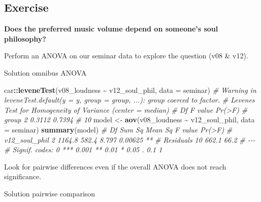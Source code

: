 \documentclass[
]{book}
\newenvironment{Shaded}{\begin{snugshade}}{\end{snugshade}}
\newcommand{\AttributeTok}[1]{\textcolor[rgb]{0.13,0.29,0.53}{#1}}
\newcommand{\CommentTok}[1]{\textcolor[rgb]{0.56,0.35,0.01}{\textit{#1}}}
\newcommand{\FunctionTok}[1]{\textcolor[rgb]{0.13,0.29,0.53}{\textbf{#1}}}
\newcommand{\NormalTok}[1]{#1}
\newcommand{\OtherTok}[1]{\textcolor[rgb]{0.56,0.35,0.01}{#1}}
\newcommand{\SpecialCharTok}[1]{\textcolor[rgb]{0.81,0.36,0.00}{\textbf{#1}}}
\begin{document}
\subsection{Exercise}\label{exercise-7}

\textbf{Does the preferred music volume depend on someone's soul philosophy?}

Perform an ANOVA on our seminar data to explore the question (v08 \& v12).

Solution omnibus ANOVA

\begin{Shaded}
\begin{Highlighting}[]
\NormalTok{car}\SpecialCharTok{::}\FunctionTok{leveneTest}\NormalTok{(v08\_loudness }\SpecialCharTok{\textasciitilde{}}\NormalTok{ v12\_soul\_phil, }\AttributeTok{data =}\NormalTok{ seminar)}
\CommentTok{\# Warning in leveneTest.default(y = y, group = group, ...): group coerced to factor.}
\CommentTok{\# Levene\textquotesingle{}s Test for Homogeneity of Variance (center = median)}
\CommentTok{\#       Df F value Pr(\textgreater{}F)}
\CommentTok{\# group  2  0.3112 0.7394}
\CommentTok{\#       10}
\NormalTok{model }\OtherTok{\textless{}{-}} \FunctionTok{aov}\NormalTok{(v08\_loudness }\SpecialCharTok{\textasciitilde{}}\NormalTok{ v12\_soul\_phil, }\AttributeTok{data =}\NormalTok{ seminar)}
\FunctionTok{summary}\NormalTok{(model)}
\CommentTok{\#               Df Sum Sq Mean Sq F value  Pr(\textgreater{}F)   }
\CommentTok{\# v12\_soul\_phil  2 1164.8   582.4   8.797 0.00625 **}
\CommentTok{\# Residuals     10  662.1    66.2                   }
\CommentTok{\# {-}{-}{-}}
\CommentTok{\# Signif. codes:  0 \textquotesingle{}***\textquotesingle{} 0.001 \textquotesingle{}**\textquotesingle{} 0.01 \textquotesingle{}*\textquotesingle{} 0.05 \textquotesingle{}.\textquotesingle{} 0.1 \textquotesingle{} \textquotesingle{} 1}
\end{Highlighting}
\end{Shaded}

Look for pairwise differences even if the overall ANOVA does not reach significance.

Solution pairwise comparison

\begin{Shaded}
\end{Shaded}
\end{document}
